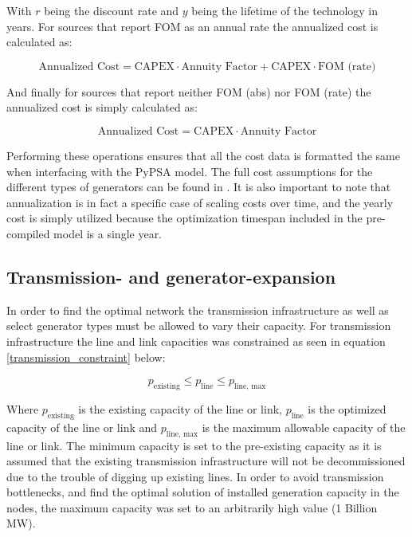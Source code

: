 \documentclass[preprint,12pt,nopreprintline]{elsarticle}
\begin{document}
\medskip
\noindent
With $r$ being the discount rate and $y$ being the lifetime of the technology in years. For sources that report FOM as an annual rate the annualized cost is calculated as:

\begin{equation}
\text{Annualized Cost}
=
\text{CAPEX} \cdot \text{Annuity Factor} + \text{CAPEX} \cdot \text{FOM (rate)}
\end{equation}

\medskip
\noindent
And finally for sources that report neither FOM (abs) nor FOM (rate) the annualized cost is simply calculated as:

\begin{equation}
\text{Annualized Cost}
=
\text{CAPEX} \cdot \text{Annuity Factor}
\end{equation}

\medskip
\noindent
Performing these operations ensures that all the cost data is formatted the same when interfacing with the PyPSA model. The full cost assumptions for the different types of generators can be found in . It is also important to note that annualization is in fact a specific case of scaling costs over time, and the yearly cost is simply utilized because the optimization timespan included in the pre-compiled model is a single year.

\subsection{Transmission- and generator-expansion} \label{Transmission_and_generator_expansion}
\noindent
In order to find the optimal network the transmission infrastructure as well as select generator types must be allowed to vary their capacity. For transmission infrastructure the line and link capacities was constrained as seen in equation \eqref{transmission_constraint} below:

\begin{equation}
p_{\text{existing}}\leq p_{\text{line}} \leq p_{\text{line, max}}
\label{transmission_constraint}
\end{equation}

\medskip
\noindent
Where $p_{\text{existing}}$ is the existing capacity of the line or link, $p_{\text{line}}$ is the optimized capacity of the line or link and $p_{\text{line, max}}$ is the maximum allowable capacity of the line or link. The minimum capacity is set to the pre-existing  capacity as it is assumed that the existing transmission infrastructure will not be decommissioned due to the trouble of digging up existing lines. In order to avoid transmission bottlenecks, and find the optimal solution of installed generation capacity in the nodes, the maximum capacity was set to an arbitrarily high value (1 Billion MW).
\end{document}
